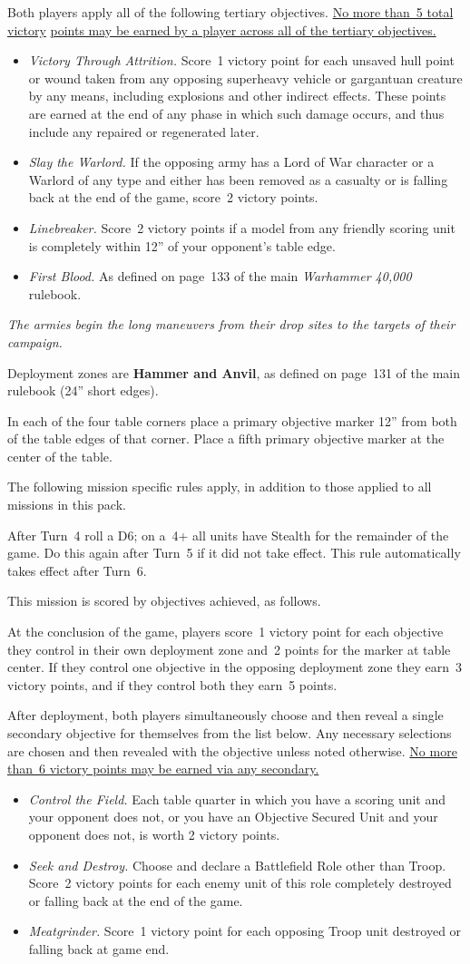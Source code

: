 \documentclass{40k}
\newcommand{\tertiaries}
{%
\missionsubheading{Tertiary Objectives.}  Both players apply all of
the following tertiary objectives.  \underline{No more than~5 total
  victory} \underline{points may be earned by a player across all of
  the tertiary objectives.}

\begin{itemize}
\item \textit{Victory Through Attrition.}  Score~1 victory point for
  each unsaved hull point or wound taken from any opposing superheavy
  vehicle or gargantuan creature by any means, including explosions
  and other indirect effects.  These points are earned at the end of
  any phase in which such damage occurs, and thus include any repaired
  or regenerated later.

\item \textit{Slay the Warlord.}  If the opposing army has a Lord of
  War character or a Warlord of any type and either has been removed
  as a casualty or is falling back at the end of the game, score~2
  victory points.

\item \textit{Linebreaker.}  Score~2 victory points if a model from
  any friendly scoring unit is completely within 12'' of your
  opponent's table edge.

\item \textit{First Blood.}  As defined on page~133 of the main
  \emph{Warhammer 40,000} rulebook.
\end{itemize}
}
\begin{document}
\tertiaries


\clearpage
{}

\centerline{\emph{The armies begin the long maneuvers from their drop
    sites to the targets of their campaign.}}


Deployment zones are \textbf{Hammer and Anvil}, as defined on page~131
of the main rulebook (24'' short edges).

\bigskip%
In each of the four table corners place a primary objective marker
12'' from both of the table edges of that corner.  Place a fifth
primary objective marker at the center of the table.


The following mission specific rules apply, in addition to those
applied to all missions in this pack.

  After Turn~4 roll a D6; on a~4+
all units have Stealth for the remainder of the game.  Do this again
after Turn~5 if it did not take effect.  This rule automatically takes
effect after Turn~6.



This mission is scored by objectives achieved, as follows.

 At the conclusion of the game,
players score~1 victory point for each objective they control in their
own deployment zone and~2 points for the marker at table center.  If
they control one objective in the opposing deployment zone they earn~3
victory points, and if they control both they earn~5 points.


After deployment, both players simultaneously choose and then reveal a
single secondary objective for themselves from the list below.  Any
necessary selections are chosen and then revealed with the objective
unless noted otherwise.  \underline{No more than~6 victory points may
  be earned via any secondary.}

\begin{itemize}
\item \textit{Control the Field.}  Each table quarter in which you
  have a scoring unit and your opponent does not, or you have an
  Objective Secured Unit and your opponent does not, is worth 2
  victory points.

\item \textit{Seek and Destroy.}  Choose and declare a Battlefield
  Role other than Troop.  Score~2 victory points for each enemy unit
  of this role completely destroyed or falling back at the end of the
  game.

\item \textit{Meatgrinder.}  Score~1 victory point for each opposing
  Troop unit destroyed or falling back at game end.

\end{itemize}
\end{document}
